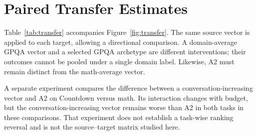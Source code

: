 \section{Paired Transfer Estimates}
\label{app:transfer}
\begin{table}[t]
\centering\small

\caption{Selected Qwen3.5-9B domain-profile transfers. Accuracy and answer changes are percentage points; token changes are generated tokens. Estimates use the paired unsteered target baseline. Intervals resample tasks after averaging two decoding seeds. Comparisons share baselines and are not a newly multiplicity-adjusted family.}
\label{tab:transfer}
\end{table}
Table~\ref{tab:transfer} accompanies Figure~\ref{fig:transfer}. The same source vector is applied to each target, allowing a directional comparison. A domain-average GPQA vector and a selected GPQA archetype are different interventions; their outcomes cannot be pooled under a single domain label. Likewise, A2 must remain distinct from the math-average vector.

A separate experiment compares the difference between a conversation-increasing vector and A2 on Countdown versus math. Its interaction changes with budget, but the conversation-increasing vector remains worse than A2 in both tasks in these comparisons. That experiment does not establish a task-wise ranking reversal and is not the source--target matrix studied here.

